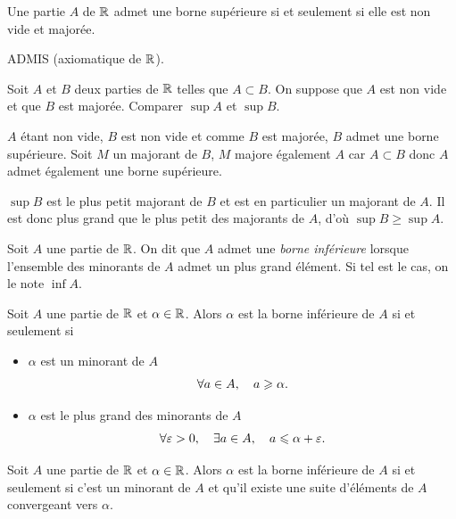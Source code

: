 \documentclass{magnoliaold}
\begin{document}
\begin{theoreme}
Une partie $A$ de $\mathbb{R}$ admet une borne supérieure si et seulement si elle est
non vide et majorée.
\end{theoreme}

\begin{preuve}
ADMIS (axiomatique de $\mathbb{R}$).
\end{preuve}

\begin{exoUnique}
\exo Soit $A$ et $B$ deux parties de $\mathbb{R}$ telles que $A\subset B$. On
  suppose que $A$ est non vide et que $B$ est majorée. Comparer $\sup A$ et
  $\sup B$.
\end{exoUnique}

\begin{sol}
$A$ étant non vide, $B$ est non vide et comme $B$ est majorée, $B$ admet une borne supérieure. Soit $M$ un majorant de $B$, $M$ majore également $A$ car $A\subset B$ donc $A$ admet également une borne supérieure.

$\sup B$ est le plus petit majorant de $B$ et est en particulier un majorant de $A$. Il est donc plus grand que le plus petit des majorants de $A$, d'où $\sup B \geq \sup A$.
\end{sol}


\begin{definition}[utile=-3]
Soit $A$ une partie de $\mathbb{R}$. On dit que $A$ admet une \emph{borne inférieure} lorsque
l'ensemble des minorants de $A$ admet un plus grand élément. Si tel est le cas,
on le note $\inf A$.
\end{definition}



\begin{proposition}
Soit $A$ une partie de $\mathbb{R}$ et $\alpha\in\mathbb{R}$. Alors $\alpha$ est la borne inférieure
de $A$ si et seulement si
\begin{itemize}
\item $\alpha$ est un minorant de $A$
  \[\forall a\in A ,\quad a \geqslant \alpha.\]
\item $\alpha$ est le plus grand des minorants de $A$
  \[\forall \varepsilon>0 ,\quad \exists a\in A ,\quad a\leqslant \alpha+\varepsilon.\]
\end{itemize}
\end{proposition}


\begin{proposition}
Soit $A$ une partie de $\mathbb{R}$ et $\alpha\in\mathbb{R}$. Alors $\alpha$ est la borne inférieure
de $A$ si et seulement si c'est un minorant de $A$ et qu'il existe une suite
d'éléments de $A$ convergeant vers $\alpha$.
\end{proposition}  
\end{document}
